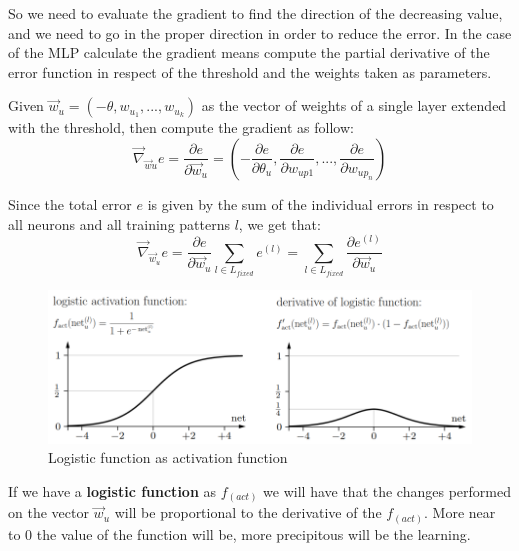 \documentclass{article}
\begin{document}
So we need to evaluate the gradient to find the direction of the decreasing value, and
we need to go in the proper direction in order to reduce the error. In the case of the MLP
calculate the gradient means compute the partial derivative of the error function in respect
of the threshold and the weights taken as parameters.

Given $\vec{w}_u=(-\theta,w_{u_1},...,w_{u_k})$ as the vector of weights of a single layer
extended with the threshold, then compute the gradient as follow:
$$\vec{\nabla}_{\vec{w}u}e=\frac{\partial e}{\partial\vec{w}_u}=\left(-\frac{\partial e}{\partial\theta_u},\frac{\partial e}{\partial w_{up1}},...,\frac{\partial e}{\partial w_{up_n}}\right)$$

Since the total error $e$ is given by the sum of the individual errors in respect to all
neurons and all training patterns $l$, we get that:
$$\vec{\nabla}_{\vec{w}_u} e=\frac{\partial e}{\partial\vec{w}_u}\sum_{l\in L_{fixed}}e^{(l)}=\sum_{l\in L_{fixed}}\frac{\partial e^{(l)}}{\partial\vec{w}_u}$$

\begin{figure}[H]
    \centering
    \includegraphics[scale=0.5]{images/logistic_gradient.png}
    \caption{Logistic function as activation function}
    \label{fig:log_func_gradient}
\end{figure}

If we have a \textbf{logistic function} as $f_{(act)}$ we will have that the changes
performed on the vector $\vec{w}_u$ will be proportional to the derivative of the $f_{(act)}$.
More near to $0$ the value of the function will be, more precipitous will be the learning.
\end{document}
